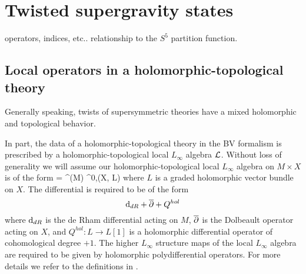 

%

\section{Twisted supergravity states}

operators, indices, etc..
relationship to the $S^5$ partition function.

\subsection{Local operators in a holomorphic-topological theory}

Generally speaking, twists of supersymmetric theories have a mixed holomorphic and topological behavior.


\parsec[]

%
%
In part, the data of a holomorphic-topological theory in the BV formalism is prescribed by a holomorphic-topological local $L_\infty$ algebra $\mathcal L$.
Without loss of generality we will assume our holomorphic-topological local $L_\infty$ algebra on $M \times X$ is of the form
\beqn\label{eqn:cL}
\cL = \Omega^\bu (M) \hotimes \Omega^{0,\bu}(X, L) 
\eeqn
where $L$ is a graded holomorphic vector bundle on $X$.
The differential is required to be of the form
\[
{\rm d}_{dR} + \overline{\partial} + Q^{hol}
\]
where ${\rm d}_{dR}$ is the de Rham differential acting on $M$, $\overline{\partial}$ is the Dolbeault operator acting on $X$, and $Q^{hol} \colon L \to L[1]$ is a holomorphic differential operator of cohomological degree $+1$. 
The higher $L_\infty$ structure maps of the local $L_\infty$ algebra are required to be given by holomorphic polydifferential operators. 
For more details we refer to the definitions in \cite{GRWthf}.

